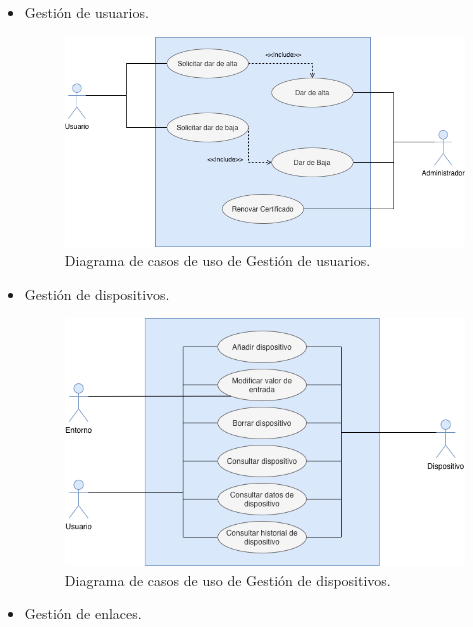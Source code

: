 \begin{itemize}
    \item Gestión de usuarios.
    
    \vspace{5mm}

    \begin{figure}[h!]
        \centering
        \includegraphics[width=12cm]{imagenes/diagramas/diagrama_gestion_usuarios}
        \caption{Diagrama de casos de uso de Gestión de usuarios.}
        \label{fig:gestion-de-usuarios}
    \end{figure}

    \newpage

    \item Gestión de dispositivos.
    
    \vspace{5mm}

    \begin{figure}[h!]
        \centering
        \includegraphics[width=12cm]{imagenes/diagramas/diagrama_gestion_dispositivos}
        \caption{Diagrama de casos de uso de Gestión de dispositivos.}
        \label{fig:gestion-de-dispositivos}
    \end{figure}

    \item Gestión de enlaces.
    
    \vspace{5mm}

\end{itemize}

